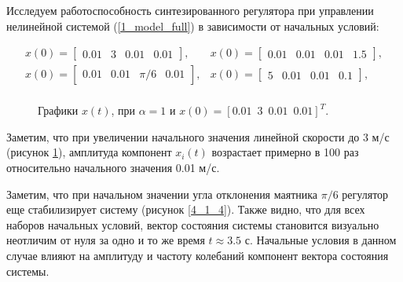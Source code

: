Исследуем работоспособность синтезированного регулятора при управлении нелинейной системой (\ref{1_model_full}) в зависимости от начальных условий:

\begin{equation*}
  \begin{matrix}
      x(0) = \begin{bmatrix}
          0.01 & 3 & 0.01 & 0.01
      \end{bmatrix}, & x(0) = \begin{bmatrix}
          0.01 & 0.01 & 0.01 & 1.5
      \end{bmatrix},\\
      x(0) = \begin{bmatrix}
          0.01 & 0.01 & \pi /6 & 0.01
      \end{bmatrix}, & x(0) = \begin{bmatrix}
          5 & 0.01 & 0.01 & 0.1
      \end{bmatrix},\\ 
 \end{matrix}
\end{equation*}

\begin{figure}[!h]
\caption{Графики $x(t)$, при $\alpha = 1$ и $x(0) = [0.01\, \, \,  3\, \, \, 0.01\, \, \, 0.01]^T$.}
\label{4_1_2}
\end{figure}

Заметим, что при увеличении начального значения линейной скорости до 3 м/с (рисунок \ref{4_1_2}), амплитуда компонент $x_i(t)$ возрастает примерно в 100 раз относительно начального значения 0.01 м/с.

Заметим, что при начальном значении угла отклонения маятника $\pi / 6$ регулятор еще стабилизирует систему (рисунок \ref{4_1_4}). Также видно, что для всех наборов начальных условий, вектор состояния системы становится визуально неотличим от нуля за одно и то же время $t \approx 3.5$ с. Начальные условия в данном случае влияют на амплитуду и частоту колебаний компонент вектора состояния системы.

